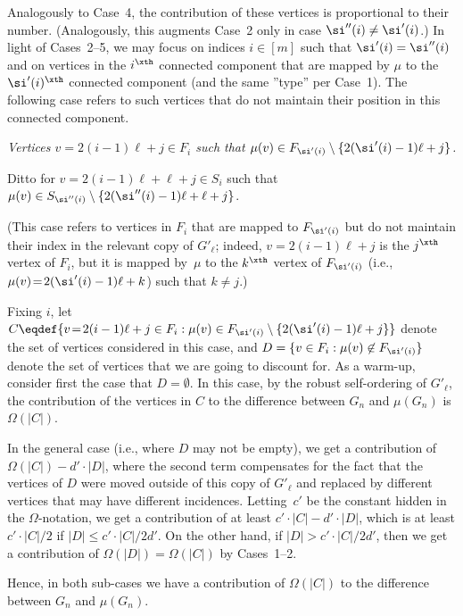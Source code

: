 Analogously to Case~4, the contribution of these vertices
is proportional to their number.
(Analogously, this augments Case~2 only in case $\si''(i)\neq\si'(i)$.)
\EDes
In light of Cases~2--5, we may focus on indices $i\in[m]$
such that $\si'(i)=\si''(i)$ and on vertices in the $i^\xth$
connected component that are mapped by $\mu$ to
the $\si'(i)^\xth$ connected component
(and the same ''type'' per Case~1).
The following case refers to such vertices that do not
maintain their position in this connected component.

\BDes
\item[{\em Case 6}:]
{\em Vertices $v\!=\!2(i-1)\ell+j\in F_i$
such that $\mu(v)\in F_{\si'(i)}\setminus\{2(\si'(i)-1)\ell+j\}$.}

Ditto for $v\!=\!2(i-1)\ell+\ell+j\in S_i$
such that $\mu(v)\in S_{\si''(i)}\setminus\{2(\si''(i)-1)\ell+\ell+j\}$.

(This case refers to vertices in $F_i$ that are mapped to $F_{\si'(i)}$
but do not maintain their index in the relevant copy of $G'_\ell$;
indeed, $v\!=\!2(i-1)\ell+j$ is the $j^\xth$ vertex of $F_i$,
but it is mapped by~$\mu$ to the $k^\xth$ vertex of $F_{\si'(i)}$
(i.e., $\mu(v)\!=\!2(\si'(i)-1)\ell+k$) such that $k\neq j$.)
%
%

Fixing $i$, let
$C\eqdef\{v\!=\!2(i-1)\ell+j\in F_i:
  \mu(v)\in F_{\si'(i)}\setminus\{2(\si'(i)-1)\ell+j\}\}$
denote the set of vertices considered in this case,
and $D=\{v\in F_i:\mu(v)\not\in F_{\si'(i)}\}$
denote the set of vertices that we are going to discount for.
%
As a warm-up, consider first the case that $D=\emptyset$.
In this case, by the robust self-ordering of $G'_\ell$,
the contribution of the vertices in $C$
to the difference between $G_n$ and $\mu(G_n)$
is $\Omega(|C|)$.

In the general case (i.e., where $D$ may not be empty),
we get a contribution of $\Omega(|C|)-d'\cdot|D|$,
where the second term compensates for the fact that the vertices
of $D$ were moved outside of this copy of $G'_\ell$ and replaced
by different vertices that may have different incidences.
Letting~$c'$ be the constant hidden in the $\Omega$-notation,
we get a contribution of
at least $c'\cdot|C|-d'\cdot|D|$,
which is at least $c'\cdot|C|/2$ if $|D|\leq c'\cdot|C|/2d'$.
On the other hand, if $|D|>c'\cdot|C|/2d'$,
then we get a contribution of $\Omega(|D|)=\Omega(|C|)$ by Cases~1--2.

Hence, in both sub-cases we have a contribution of $\Omega(|C|)$
to the difference between $G_n$ and $\mu(G_n)$.


